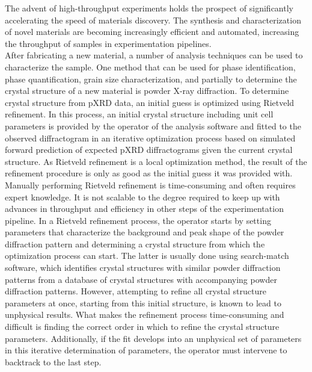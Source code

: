 The advent of high-throughput experiments holds the prospect of significantly accelerating the speed of materials discovery\cite{Liu2019}. The synthesis and characterization of novel materials are becoming increasingly efficient and automated, increasing the throughput of samples in experimentation pipelines\cite{MacLeod2019, Ludwig2019, Ozaki2020}. \\

After fabricating a new material, a number of analysis techniques can be used to characterize the sample. One method that can be used for phase identification, phase quantification, grain size characterization, and partially to determine the crystal structure of a new material is powder X-ray diffraction. To determine crystal structure from pXRD data, an initial guess is optimized using Rietveld refinement. In this process, an initial crystal structure including unit cell parameters is provided by the operator of the analysis software and fitted to the observed diffractogram in an iterative optimization process based on simulated forward prediction of expected pXRD diffractograms given the current crystal structure\cite{Dinnebier2019, Cano2021}. As Rietveld refinement is a local optimization method, the result of the refinement procedure is only as good as the initial guess it was provided with. \\

Manually performing Rietveld refinement is time-consuming and often requires expert knowledge. It is not scalable to the degree required to keep up with advances in throughput and efficiency in other steps of the experimentation pipeline. In a Rietveld refinement process, the operator starts by setting parameters that characterize the background and peak shape of the powder diffraction pattern and determining a crystal structure from which the optimization process can start. The latter is usually done using search-match software, which identifies crystal structures with similar powder diffraction patterns from a database of crystal structures with accompanying powder diffraction patterns. However, attempting to refine all crystal structure parameters at once, starting from this initial structure, is known to lead to unphysical results. What makes the refinement process time-consuming and difficult is finding the correct order in which to refine the crystal structure parameters\cite{Ozaki2020}.  Additionally, if the fit develops into an unphysical set of parameters in this iterative determination of parameters, the operator must intervene to backtrack to the last step. \\

